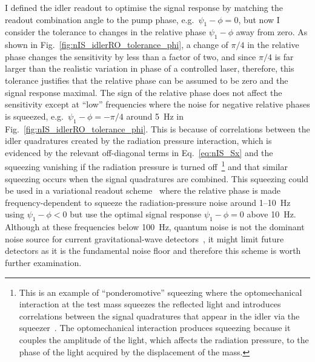 I defined the idler readout to optimise the signal response by matching the readout combination angle to the pump phase, e.g.\ $\psi_1-\phi=0$, but now I consider the tolerance to changes in the relative phase $\psi_1-\phi$ away from zero. %
As shown in Fig.~\ref{fig:nIS_idlerRO_tolerance_phi}, a change of $\pi/4$ in the relative phase changes the sensitivity by less than a factor of two, and since $\pi/4$ is far larger than the realistic variation in phase of a controlled laser\jam{(~\cite{})}, therefore, this tolerance justifies that the relative phase can be assumed to be zero and the signal response maximal. %
The sign of the relative phase does not affect the sensitivity except at ``low'' frequencies where the noise for negative relative phases is squeezed, e.g.\ $\psi_1-\phi=-\pi/4$ around 5~Hz in Fig.~\ref{fig:nIS_idlerRO_tolerance_phi}. This is because of correlations between the idler quadratures created by the radiation pressure interaction, which is evidenced by the relevant off-diagonal terms in Eq.~\ref{eq:nIS_Sx} and the squeezing vanishing if the radiation pressure is turned off~\footnote{This is an example of ``ponderomotive'' squeezing where the optomechanical interaction at the test mass squeezes the reflected light and introduces correlations between the signal quadratures that appear in the idler via the squeezer~\cite{kimble_2001}. The optomechanical interaction produces squeezing because it couples the amplitude of the light, which affects the radiation pressure, to the phase of the light acquired by the displacement of the mass.} and that similar squeezing occurs when the signal quadratures are combined.
This squeezing could be used in a variational readout scheme~\cite{zhangBroadbandSignalRecycling2021} where the relative phase is made frequency-dependent to squeeze the radiation-pressure noise around 1--10~Hz using $\psi_1-\phi<0$ but use the optimal signal response $\psi_1-\phi=0$ above 10~Hz. Although at these frequencies below 100~Hz, quantum noise is not the dominant noise source for current gravitational-wave detectors~\cite{buikemaSensitivityPerformanceAdvanced2020}, it might limit future detectors as it is the fundamental noise floor and therefore this scheme is worth further examination.
